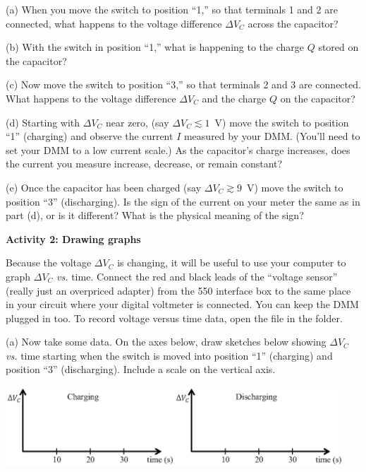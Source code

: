 (a) When you move the switch to position ``1,'' so that terminals 1 and 2 are connected, what happens to the voltage difference $\Delta V_C$ across the capacitor?
\answerspace{0.6in}

(b)  With the switch in position ``1,'' what is happening to the charge $Q$ stored on the capacitor?
\answerspace{0.6in}

(c)  Now move the switch to position ``3,'' so that terminals 2 and 3 are connected.  What happens to the voltage difference $\Delta V_C$ and the charge $Q$ on the capacitor?
\answerspace{0.7in}

\pagebreak[2]
(d) Starting with $\Delta V_C$ near zero, (say $\Delta V_C \lesssim 1$~V) move the switch to position ``1'' (charging) and observe the current $I$ measured by your DMM.  (You'll need to set your DMM to a low current scale.)  As the capacitor's charge increases, does the current you measure increase, decrease, or remain constant?
\answerspace{0.5in}

(e) Once the capacitor has been charged (say $\Delta V_C \gtrsim 9$~V) move the switch to position ``3'' (discharging).  Is the sign of the current on your meter the same as in part (d), or is it different?  What is the physical meaning of the sign?
\answerspace{0.7in}

\textbf{Activity 2: Drawing graphs}

Because the voltage $\Delta V_C$ is changing, it will be useful to use your computer to graph $\Delta V_C$ \textit{vs.} time.  Connect the red and black leads of the ``voltage sensor'' (really just an overpriced adapter) from the 550 interface box to the same place in your circuit where your digital voltmeter is connected.  You can keep the DMM plugged in too.
To record voltage versus time data, open the file  in the \filename{\coursefolder} folder.

(a)  Now take some data.  On the axes below, draw sketches below showing $\Delta V_C$ \textit{vs.} time starting when the switch is moved into position ``1'' (charging) and position ``3'' (discharging).  Include a scale on the vertical axis.

\begin{center}
\vspace{-0.4 in}
\includegraphics[width=0.95\textwidth]{rc_circuits/vc_axes.eps}
\vspace{-0.1 in}
\end{center}


